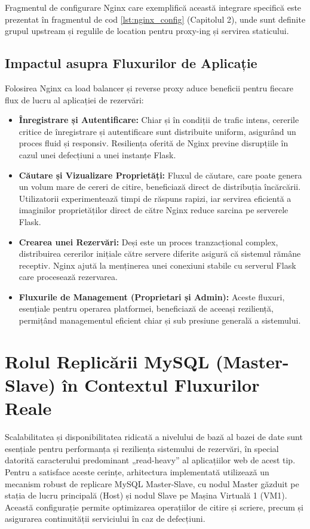 \documentclass[12pt, a4paper, oneside, romanian]{teza-upb}
\begin{document}
Fragmentul de configurare Nginx care exemplifică această integrare specifică este prezentat în fragmentul de cod \ref{lst:nginx_config} (Capitolul 2), unde sunt definite grupul upstream și regulile de location pentru proxy-ing și servirea staticului.

\subsection*{Impactul asupra Fluxurilor de Aplicație}
Folosirea Nginx ca load balancer și reverse proxy aduce beneficii pentru fiecare flux de lucru al aplicației de rezervări:
\begin{itemize}
	\item \textbf{Înregistrare și Autentificare:} Chiar și în condiții de trafic intens, cererile critice de înregistrare și autentificare sunt distribuite uniform, asigurând un proces fluid și responsiv. Resiliența oferită de Nginx previne disrupțiile în cazul unei defecțiuni a unei instanțe Flask.
	
	\item \textbf{Căutare și Vizualizare Proprietăți:} Fluxul de căutare, care poate genera un volum mare de cereri de citire, beneficiază direct de distribuția încărcării. Utilizatorii experimentează timpi de răspuns rapizi, iar servirea eficientă a imaginilor proprietăților direct de către Nginx reduce sarcina pe serverele Flask.
	
	\item \textbf{Crearea unei Rezervări:} Deși este un proces tranzacțional complex, distribuirea cererilor inițiale către servere diferite asigură că sistemul rămâne receptiv. Nginx ajută la menținerea unei conexiuni stabile cu serverul Flask care procesează rezervarea.
	
	\item \textbf{Fluxurile de Management (Proprietari și Admin):} Aceste fluxuri, esențiale pentru operarea platformei, beneficiază de aceeași reziliență, permițând managementul eficient chiar și sub presiune generală a sistemului.
\end{itemize}


\section{Rolul Replicării MySQL (Master-Slave) în Contextul Fluxurilor Reale}
Scalabilitatea și disponibilitatea ridicată a nivelului de bază al bazei de date sunt esențiale pentru performanța și reziliența sistemului de rezervări, în special datorită caracterului predominant „read-heavy” al aplicațiilor web de acest tip. Pentru a satisface aceste cerințe, arhitectura implementată utilizează un mecanism robust de replicare MySQL Master-Slave, cu nodul Master găzduit pe stația de lucru principală (Host) și nodul Slave pe Mașina Virtuală 1 (VM1). Această configurație permite optimizarea operațiilor de citire și scriere, precum și asigurarea continuității serviciului în caz de defecțiuni.
\end{document}
